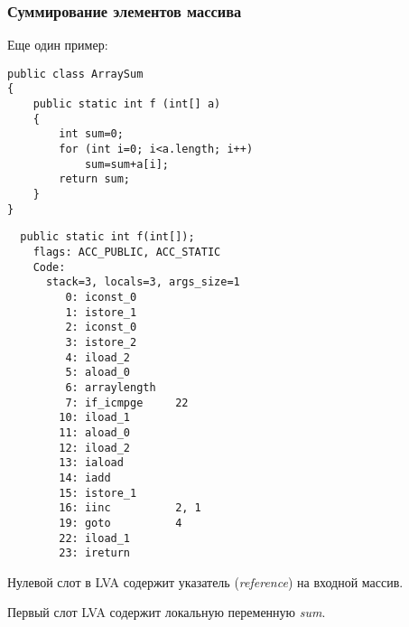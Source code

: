 \subsubsection{Суммирование элементов массива}

Еще один пример:

\begin{lstlisting}[style=customjava]
public class ArraySum
{
	public static int f (int[] a)
	{
		int sum=0;
		for (int i=0; i<a.length; i++)
			sum=sum+a[i];
		return sum;
	}
}
\end{lstlisting}

\begin{lstlisting}
  public static int f(int[]);
    flags: ACC_PUBLIC, ACC_STATIC
    Code:
      stack=3, locals=3, args_size=1
         0: iconst_0      
         1: istore_1      
         2: iconst_0      
         3: istore_2      
         4: iload_2       
         5: aload_0       
         6: arraylength   
         7: if_icmpge     22
        10: iload_1       
        11: aload_0       
        12: iload_2       
        13: iaload        
        14: iadd          
        15: istore_1      
        16: iinc          2, 1
        19: goto          4
        22: iload_1       
        23: ireturn       
\end{lstlisting}

Нулевой слот в \ac{LVA} содержит указатель (\emph{reference}) на входной массив.

Первый слот \ac{LVA} содержит локальную переменную \emph{sum}.
